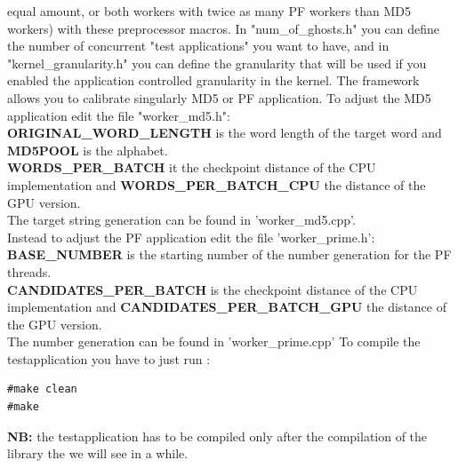 \documentclass[a4paper,13pt]{article}
\begin{document}
\begin{multicols}{2}
        equal amount, or both workers with twice as many PF workers than MD5 workers) with these preprocessor
        macros. In "num\_of\_ghosts.h" you can define the number of concurrent "test applications" you want to
        have, and in "kernel\_granularity.h" you can define the granularity that will be used if you enabled
        the application controlled granularity in the kernel.
        The framework allows you to calibrate singularly MD5 or PF application.
        To adjust the MD5 application edit the file "worker\_md5.h":\\
        {\bf ORIGINAL\_WORD\_LENGTH} is the word length of the target word and {\bf MD5POOL} is the alphabet.\\
        {\bf WORDS\_PER\_BATCH} it the checkpoint distance of the CPU implementation and {\bf WORDS\_PER\_BATCH\_CPU}
        the distance of the GPU version.\\
        The target string generation can be found in 'worker\_md5.cpp'.\\
        Instead to adjust the PF application edit the file 'worker\_prime.h':\\
        {\bf BASE\_NUMBER} is the starting number of the number generation for the PF threads.\\
        {\bf CANDIDATES\_PER\_BATCH} is the checkpoint distance of the CPU implementation and {\bf CANDIDATES\_PER\_BATCH\_GPU} 
        the distance of the GPU version.\\
        The number generation can be found in 'worker\_prime.cpp' 
        \newline
        To compile the testapplication you have to just run :
        \begin{lstlisting}
#make clean
#make 
        \end{lstlisting}
        {\bf NB:} the testapplication has to be compiled only after the compilation of the library the we will see
        in a while.







\end{multicols}
\end{document}
